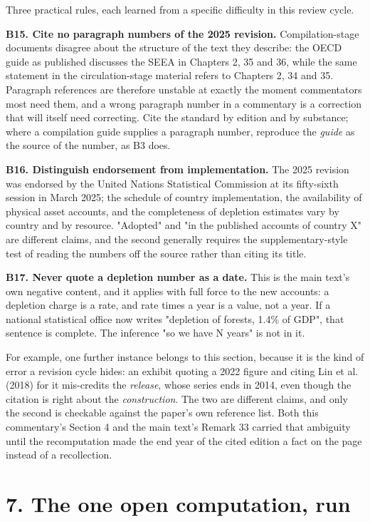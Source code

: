 \documentclass[11pt]{article}
\begin{document}
Three practical rules, each learned from a specific difficulty in this review cycle.

\textbf{B15. Cite no paragraph numbers of the 2025 revision.} Compilation-stage documents disagree about the structure of the text they describe: the OECD guide as published discusses the SEEA in Chapters 2, 35 and 36, while the same statement in the circulation-stage material refers to Chapters 2, 34 and 35. Paragraph references are therefore unstable at exactly the moment commentators most need them, and a wrong paragraph number in a commentary is a correction that will itself need correcting. Cite the standard by edition and by substance; where a compilation guide supplies a paragraph number, reproduce the \emph{guide} as the source of the number, as B3 does.

\textbf{B16. Distinguish endorsement from implementation.} The 2025 revision was endorsed by the United Nations Statistical Commission at its fifty-sixth session in March 2025; the schedule of country implementation, the availability of physical asset accounts, and the completeness of depletion estimates vary by country and by resource. "Adopted" and "in the published accounts of country X" are different claims, and the second generally requires the supplementary-style test of reading the numbers off the source rather than citing its title.

\textbf{B17. Never quote a depletion number as a date.} This is the main text's own negative content, and it applies with full force to the new accounts: a depletion charge is a rate, and rate times a year is a value, not a year. If a national statistical office now writes "depletion of forests, 1.4\% of GDP", that sentence is complete. The inference "so we have N years" is not in it.

For example, one further instance belongs to this section, because it is the kind of error a revision cycle hides: an exhibit quoting a 2022 figure and citing Lin et al. (2018) for it mis-credits the \emph{release}, whose series ends in 2014, even though the citation is right about the \emph{construction}. The two are different claims, and only the second is checkable against the paper's own reference list. Both this commentary's Section 4 and the main text's Remark 33 carried that ambiguity until the recomputation made the end year of the cited edition a fact on the page instead of a recollection.

\vspace{0.8em}

\section*{7. The one open computation, run}\label{7-the-one-open-computation-run}
\end{document}
